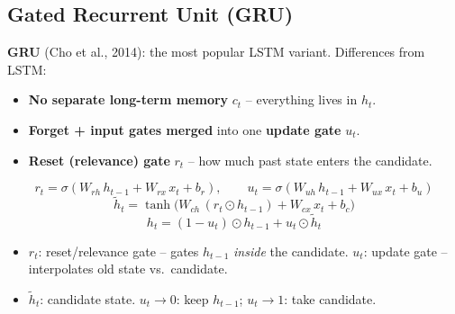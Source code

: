 \documentclass[10pt,a4paper]{article}
\begin{document}
	\subsection{Gated Recurrent Unit (GRU)}

	\begin{definitionbox}
		\textbf{GRU} (Cho et al., 2014): the most popular LSTM variant. Differences from LSTM:
		\begin{itemize}[leftmargin=*, nosep]
			\item \textbf{No separate long-term memory} $c_t$ -- everything lives in $h_t$.
			\item \textbf{Forget + input gates merged} into one \textbf{update gate} $u_t$.
			\item \textbf{Reset (relevance) gate} $r_t$ -- how much past state enters the candidate.
		\end{itemize}
	\end{definitionbox}

	\begin{formulabox}
		\[
		r_t = \sigma(W_{rh}\,h_{t-1} + W_{rx}\,x_t + b_r),\qquad
		u_t = \sigma(W_{uh}\,h_{t-1} + W_{ux}\,x_t + b_u)
		\]
		\[
		\tilde h_t = \tanh\!\big(W_{ch}\,(r_t \odot h_{t-1}) + W_{cx}\,x_t + b_c\big)
		\]
		\[
		h_t = (1-u_t)\odot h_{t-1} + u_t \odot \tilde h_t
		\]
	\end{formulabox}
	\begin{itemize}[leftmargin=*]
		\item $r_t$: reset/relevance gate -- gates $h_{t-1}$ \emph{inside} the candidate. \quad $u_t$: update gate -- interpolates old state vs.\ candidate.
		\item $\tilde h_t$: candidate state. \quad $u_t\!\to\!0$: keep $h_{t-1}$; $u_t\!\to\!1$: take candidate.
	\end{itemize}
\end{document}
